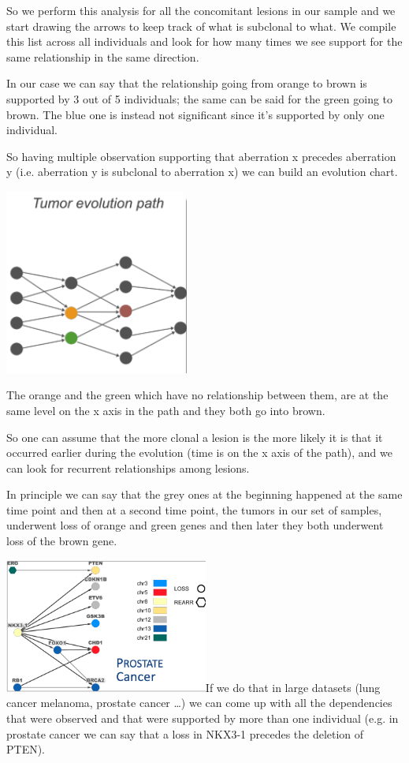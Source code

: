 So we perform this analysis for all the concomitant lesions in our sample and we
start drawing the arrows to keep track of what is subclonal to what. We compile
this list across all individuals and look for how many times we see support for
the same relationship in the same direction.

In our case we can say that the relationship going from orange to brown is
supported by 3 out of 5 individuals; the same can be said for the green going to
brown. The blue one is instead not significant since it's supported by only one
individual.

So having multiple observation supporting that aberration x precedes aberration
y (i.e. aberration y is subclonal to aberration x) we can build an evolution
chart.

\includegraphics[width=2.38194in,height=2.40417in]{image5.png}

The orange and the green which have no relationship between them, are at the
same level on the x axis in the path and they both go into brown.

So one can assume that the more clonal a lesion is the more likely it is that it
occurred earlier during the evolution (time is on the x axis of the path), and
we can look for recurrent relationships among lesions.

In principle we can say that the grey ones at the beginning happened at the same
time point and then at a second time point, the tumors in our set of samples,
underwent loss of orange and green genes and then later they both underwent loss
of the brown gene.

\includegraphics[width=2.63403in,height=1.74097in]{image6.png}If we do that in
large datasets (lung cancer melanoma, prostate cancer \ldots) we can come up
with all the dependencies that were observed and that were supported by more
than one individual (e.g. in prostate cancer we can say that a loss in NKX3-1
precedes the deletion of PTEN).

